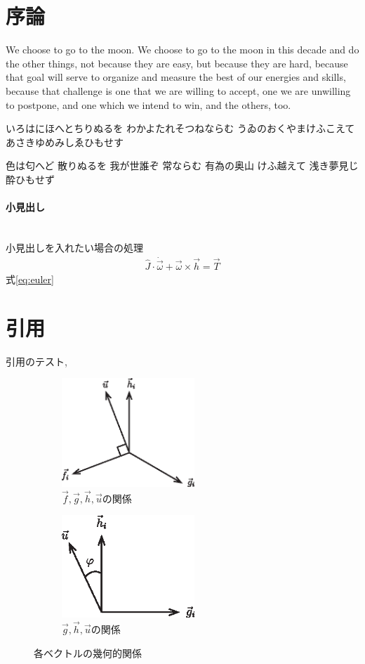 \documentclass[a4paper,uplatex,dvipdfmx,ja=standard,11pt]{bxjsarticle}
\begin{document}
	
	\section{序論}
	We choose to go to the moon. We choose to go to the moon in this decade and do the other things, not because they are easy, but because they are hard, because that goal will serve to organize and measure the best of our energies and skills, because that challenge is one that we are willing to accept, one we are unwilling to postpone, and one which we intend to win, and the others, too.
	
	
	いろはにほへとちりぬるを
	わかよたれそつねならむ
	うゐのおくやまけふこえて
	あさきゆめみしゑひもせす
	
	色は匂へど 散りぬるを
	我が世誰ぞ 常ならむ
	有為の奥山 けふ越えて
	浅き夢見じ 酔ひもせず
	
	\paragraph{小見出し}\leavevmode\\
	\indent
	小見出しを入れたい場合の処理
	\begin{align}
		\hat{J} \cdot \dot{\vec{\omega}} + \vec{\omega}\times \vec{h}  = \vec{T} \label{eq:euler}
	\end{align}
	式\eqref{eq:euler}
	
	\section{引用}
	引用のテスト\cite{Stevenson2012,Tsukahara2016},\cite{konoue2005,Wie2008,Isabelle,book,inbook,inproceeding,URL}
\begin{figure}[h]
	\begin{subfigure}{0.5\linewidth}
		\centering\includegraphics[width=5cm]{fig/fig1.eps}
		\caption{$\vec{f},\vec{g},\vec{h},\vec{u}$の関係}\label{fig:fig1}    %
	\end{subfigure}
	\begin{subfigure}{0.5\linewidth}
		\centering\includegraphics[width=5cm]{fig/fig2.eps}
		\caption{$\vec{g},\vec{h},\vec{u}$の関係}\label{fig:fig2}    %
	\end{subfigure}
	\caption{各ベクトルの幾何的関係}\label{fig:case4} 
\end{figure}


\end{document}
